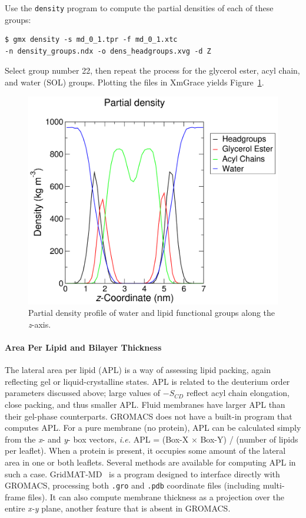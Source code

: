 \documentclass[9pt,tutorial]{livecoms}
\begin{document}
Use the \texttt{density} program to compute the partial densities of each of these groups:

\begin{verbatim}
$ gmx density -s md_0_1.tpr -f md_0_1.xtc 
-n density_groups.ndx -o dens_headgroups.xvg -d Z
\end{verbatim}

Select group number 22, then repeat the process for the glycerol ester, acyl chain, and water (SOL) groups. Plotting the files in XmGrace yields Figure~\ref{kalp_dppc_dens_fig}.

\begin{figure}[h!]
\centering
\includegraphics{plot_kalp_dppc_density}
\caption{Partial density profile of water and lipid functional groups along the {\em z}-axis.}
\label{kalp_dppc_dens_fig}
\end{figure}

\paragraph{Area Per Lipid and Bilayer Thickness} \label{kalp_ana_apl}

The lateral area per lipid (APL) is a way of assessing lipid packing, again reflecting gel or liquid-crystalline states. APL is related to the deuterium order parameters discussed above; large values of $-S_{CD}$ reflect acyl chain elongation, close packing, and thus smaller APL. Fluid membranes have larger APL than their gel-phase counterparts. GROMACS does not have a built-in program that computes APL. For a pure membrane (no protein), APL can be calculated simply from the {\em x}- and {\em y}- box vectors, {\em i.e.} APL = (Box-X $\times$ Box-Y) / (number of lipids per leaflet). When a protein is present, it occupies some amount of the lateral area in one or both leaflets. Several methods are available for computing APL in such a case. GridMAT-MD~\cite{Allen2009} is a program designed to interface directly with GROMACS, processing both \texttt{.gro} and \texttt{.pdb} coordinate files (including multi-frame files). It can also compute membrane thickness as a projection over the entire {\em x-y} plane, another feature that is absent in GROMACS.
\end{document}
